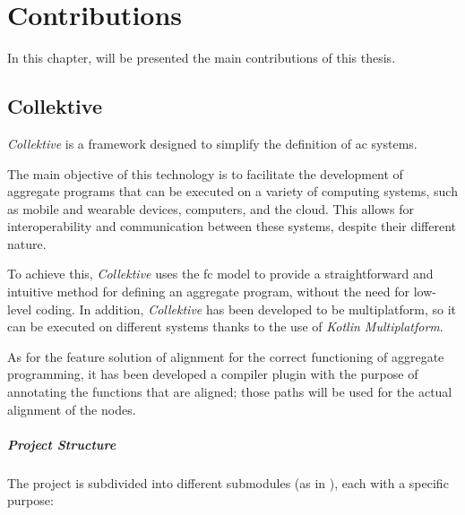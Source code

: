 

\chapter{Contributions}
\label{ch:contributions}
In this chapter, will be presented the main contributions of this thesis.

\section{Collektive}
\label{sec:collektive}

\emph{Collektive} is a framework designed to simplify the definition of \ac{ac} systems.

The main objective of this technology is to facilitate the development of aggregate programs that can be executed on a
variety of computing systems, such as mobile and wearable devices, computers, and the cloud.
This allows for interoperability and communication between these systems, despite their different nature.

To achieve this, \emph{Collektive} uses the \ac{fc} model to provide a straightforward and intuitive method for defining
an aggregate program, without the need for low-level coding.
In addition, \emph{Collektive} has been developed to be multiplatform, so it can be executed on different systems thanks
to the use of \emph{Kotlin Multiplatform}.

As for the feature solution of alignment for the correct functioning of aggregate programming,
it has been developed a compiler plugin with the purpose of annotating the functions that are aligned;
those paths will be used for the actual alignment of the nodes.

\paragraph{Project Structure}
The project is subdivided into different submodules (as in ), each with a specific purpose:

